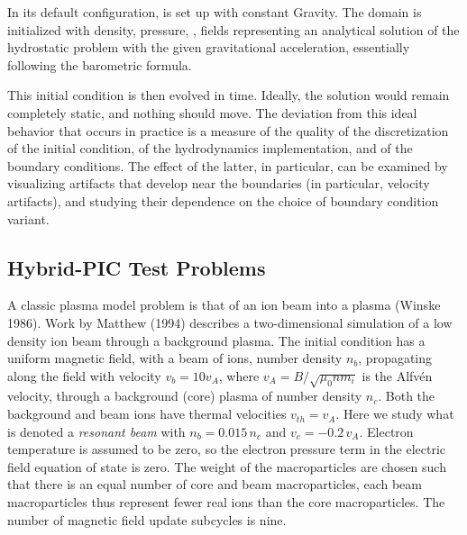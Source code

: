 In its default configuration,  is set up with constant \unit{Gravity}.
The domain is initialized with density, pressure, \etc, fields representing
an analytical solution of the hydrostatic problem with the given
gravitational acceleration, essentially following the
barometric formula.

This initial condition is then evolved in time.  Ideally, the solution would remain
completely static, and nothing should move.  The deviation from this ideal
behavior that occurs in practice is a measure of the quality of the discretization of
the initial condition, of the hydrodynamics implementation, and of the boundary
conditions.  The effect of the latter, in particular, can be examined by
visualizing artifacts that develop near the boundaries (in particular, velocity
artifacts), and studying their dependence on the choice of boundary condition variant.

\subsection{Hybrid-PIC Test Problems}
A classic plasma model problem is that of an ion beam into a 
plasma (Winske 1986). Work by Matthew (1994) describes a
two-dimensional simulation of a low density ion beam 
through a background plasma.  The initial condition has a uniform magnetic 
field, with a beam of ions, number density $n_{b}$, propagating 
along the field with velocity $v_b=10v_A$, where $v_A=B/\sqrt{\mu_0nm_i}$ 
is the Alfv\'{e}n velocity, through a background (core) plasma of 
number density $n_{c}$. 
Both the background and beam ions have thermal velocities $v_{th}=v_A$.  
Here we study what is denoted a \emph{resonant beam} 
with $n_{b}=0.015\,n_c$ and $v_c=-0.2\,v_A$. 
Electron temperature is assumed to be zero, so the electron 
pressure term in the electric field equation of state is zero. 
The weight of the macroparticles are chosen such that there is 
an equal number of core and beam macroparticles, each beam macroparticles 
thus represent fewer real ions than the core macroparticles. 
The number of magnetic field update subcycles is nine. 

